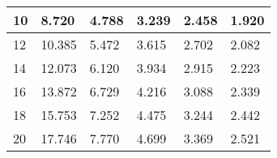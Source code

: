 \begin{table}[]
\begin{tabular}{|l|l|l|l|l|l|}
		10               & 8.720                                                                    & 4.788                                                                    & 3.239                                                                     & 2.458                                                                     & 1.920                                                                     \\ \hline
		12               & 10.385                                                                   & 5.472                                                                    & 3.615                                                                     & 2.702                                                                     & 2.082                                                                     \\ \hline
		14               & 12.073                                                                   & 6.120                                                                    & 3.934                                                                     & 2.915                                                                     & 2.223                                                                     \\ \hline
		16               & 13.872                                                                   & 6.729                                                                    & 4.216                                                                     & 3.088                                                                     & 2.339                                                                     \\ \hline
		18               & 15.753                                                                   & 7.252                                                                    & 4.475                                                                     & 3.244                                                                     & 2.442                                                                     \\ \hline
		20               & 17.746                                                                   & 7.770                                                                    & 4.699                                                                     & 3.369                                                                     & 2.521                                                                     \\ \hline

\end{tabular}
\end{table}
